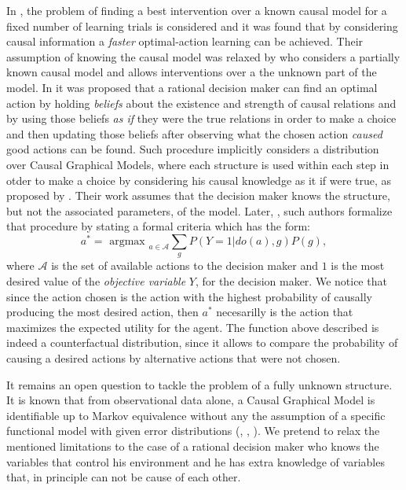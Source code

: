 \documentclass[letterpaper]{article}
\begin{document}
In \cite{lattimoreNIPS2016}, the problem of finding a best intervention over a known causal model for a fixed number of learning trials is considered and it was found that by considering causal information a \textit{faster} optimal-action learning can be achieved. Their assumption of knowing the causal model was relaxed by \cite{sen2017identifying} who considers a partially known causal model and allows interventions over a the unknown part of the model. In \cite{gonzalez2018playing} it was proposed that a rational decision maker can find an optimal action by holding \textit{beliefs} about the existence and strength of causal relations and by using those beliefs \textit{as if} they were the true relations in order to make a choice and then updating those beliefs after observing what the chosen action \textit{caused} good actions can be found. Such procedure implicitly considers a distribution over Causal Graphical Models, where each structure is used within each step in otder to make a choice by considering his causal knowledge as it if were true, as proposed by \cite{joyce1999foundations}. Their work assumes that the decision maker knows the structure, but not the associated parameters, of the model. Later, \cite{2019arXiv190202279G}, such authors formalize that procedure by stating a formal criteria which has the form:
\[  a^\ast = \textrm{ argmax }_{a \in \mathcal{A}}\sum_g P(Y=1 | do(a), g)P(g), \]
where $\mathcal{A}$ is the set of available actions to the decision maker and $1$ is the most desired value of the \textit{objective variable} $Y$, for the decision maker. We notice that since the action chosen is the action with the highest probability of causally producing the most desired action, then $a^\ast$ necesarilly is the action that maximizes the expected utility for the agent. The function above described is indeed a counterfactual distribution, since it allows to compare the probability of causing a desired actions by alternative actions that were not chosen.


It remains an open question to tackle the problem of a fully unknown structure. It is known that from observational data alone, a Causal Graphical Model is identifiable up to Markov equivalence without any the assumption of a specific functional model with given error distributions (\cite{hauser2012characterization}, \cite{hauser2012two}, \cite{peters2011identifiability}). We pretend to relax the mentioned limitations to the case of a rational decision maker who knows the variables that control his environment and he has extra knowledge of variables that, in principle can not be cause of each other. 
\end{document}
